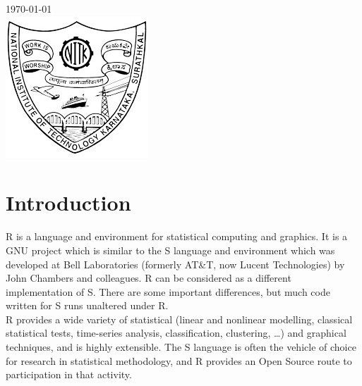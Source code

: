 \begin{titlepage}

{\large \today}\\[2cm] %


\includegraphics[scale=0.7]{logo.jpg}\\[1cm] %
 

\vfill %

\end{titlepage}

\newpage
\tableofcontents
\newpage

\section{Introduction}

R is a language and environment for statistical computing and graphics. It is a GNU project which is similar to the S language and environment which was developed at Bell Laboratories (formerly AT\&T, now Lucent Technologies) by John Chambers and colleagues. R can be considered as a different implementation of S. There are some important differences, but much code written for S runs unaltered under R. \\

R provides a wide variety of statistical (linear and nonlinear modelling, classical statistical tests, time-series analysis, classification, clustering, …) and graphical techniques, and is highly extensible. The S language is often the vehicle of choice for research in statistical methodology, and R provides an Open Source route to participation in that activity. \\

